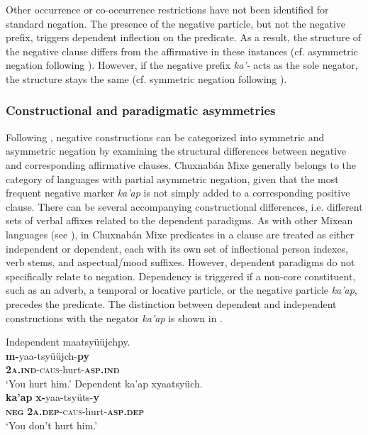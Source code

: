 \documentclass[output=paper,colorlinks,citecolor=brown,draft]{langscibook}
\begin{document}
Other occurrence or co-occurrence restrictions have not been identified for standard negation. The presence of the negative particle, but not the negative prefix, triggers dependent inflection on the predicate. As a result, the structure of the negative clause differs from the affirmative in these instances (cf. asymmetric negation following \citealt{Miestamo2005,Miestamo2007}). However, if the negative prefix \textit{ka’-} acts as the sole negator, the structure stays the same (cf. symmetric negation following \citealt{Miestamo2005,Miestamo2007}).

\subsubsection{Constructional and paradigmatic asymmetries}\label{sec:mix:2.1.1}

Following \citet{Miestamo2005,Miestamo2007,Miestamo2009neg.pragmatics,Miestamo2014,Miestamo2017}, negative constructions can be categorized into symmetric and asymmetric negation by examining the structural differences between negative and corresponding affirmative clauses. Chuxnabán Mixe generally belongs to the category of languages with partial asymmetric negation, given that the most frequent negative marker \textit{ka’ap} is not simply added to a corresponding positive clause. There can be several accompanying constructional differences, i.e. different sets of verbal affixes related to the dependent paradigms. As with other Mixean languages (see \citealt{Romero-Méndez2009}), in Chuxnabán Mixe predicates in a clause are treated as either independent or dependent, each with its own set of inflectional person indexes, verb stems, and aspectual/mood suffixes. However, dependent paradigms do not specifically relate to negation. Dependency is triggered if a non\nobreakdash-core constituent, such as an adverb, a temporal or locative particle, or the negative particle \textit{ka’ap}, precedes the predicate. The distinction between dependent and independent constructions with the negator \textit{ka’ap} is shown in .

\ea\label{ex:mix:17}
    \ea\label{ex:mix:17a}Independent \newline
        \glll maatsyüüjchpy.\\ 
              \textbf{m-}yaa-tsyüüjch-\textbf{py} \\
              \textbf{\textsc{2a.ind}}\textsc{{}-caus}{}-hurt-\textbf{\textsc{asp.ind}}\\
        \glt ‘You hurt him.’ 
    \ex\label{ex:mix:17b}Dependent\newline
        \glll ka’ap xyaatsyüch. \\
             \textbf{ka’ap} \textbf{x-}yaa-tsyüts-\textbf{y} \\
             \textbf{\textsc{neg}} \textsc{\textbf{2a.dep}-caus}-hurt-\textbf{\textsc{asp.dep}} \\
        \glt ‘You don’t hurt him.’
    \z
\z 
\end{document}
